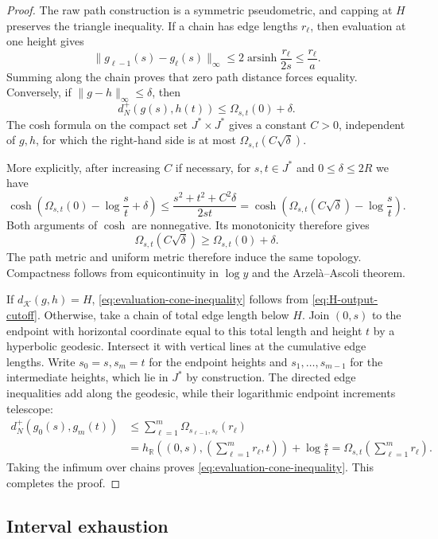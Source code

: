 \documentclass{amsart}
\numberwithin{equation}{section}
\theoremstyle{plain}
\theoremstyle{definition}
\theoremstyle{remark}
\newcommand{\R}{\mathbb R}
\DeclareMathOperator{\arsinh}{arsinh}
\begin{document}
\begin{proof}
The raw path construction is a symmetric pseudometric, and capping at $H$ preserves the triangle inequality.  If a chain has edge lengths $r_\ell$, then evaluation at one height gives
\[ \lVert g_{\ell-1}(s)-g_\ell(s)\rVert_\infty \le2\arsinh\frac{r_\ell}{2s} \le\frac{r_\ell}{a}. \]
Summing along the chain proves that zero path distance forces equality.  Conversely, if $\lVert g-h\rVert_\infty\le\delta$, then
\[ d_N^+(g(s),h(t))\le\Omega_{s,t}(0)+\delta. \]
The cosh formula on the compact set $J^*\times J^*$ gives a constant $C>0$, independent of $g,h$, for which the right-hand side is at most $\Omega_{s,t}(C\sqrt\delta)$.

More explicitly, after increasing $C$ if necessary, for $s,t\in J^*$ and $0\le\delta\le2R$ we have
\[ \cosh\left(\Omega_{s,t}(0)-\log\frac{s}{t}+\delta\right) \le\frac{s^2+t^2+C^2\delta}{2st} =\cosh\left(\Omega_{s,t}(C\sqrt\delta)-\log\frac{s}{t}\right). \]
Both arguments of $\cosh$ are nonnegative.  Its monotonicity therefore gives
\[ \Omega_{s,t}(C\sqrt\delta)\ge\Omega_{s,t}(0)+\delta. \]
The path metric and uniform metric therefore induce the same topology.  Compactness follows from equicontinuity in $\log y$ and the Arzel\`a--Ascoli theorem.

If $d_{\mathscr K}(g,h)=H$, \eqref{eq:evaluation-cone-inequality} follows from \eqref{eq:H-output-cutoff}.  Otherwise, take a chain of total edge length below $H$.  Join $(0,s)$ to the endpoint with horizontal coordinate equal to this total length and height $t$ by a hyperbolic geodesic.  Intersect it with vertical lines at the cumulative edge lengths.  Write $s_0=s,s_m=t$ for the endpoint heights and $s_1,\ldots,s_{m-1}$ for the intermediate heights, which lie in $J^*$ by construction.  The directed edge inequalities add along the geodesic, while their logarithmic endpoint increments telescope:
\[
 \begin{aligned}
d_N^+(g_0(s),g_m(t)) &\le\sum_{\ell=1}^m\Omega_{s_{\ell-1},s_\ell}(r_\ell)\\
 &=h_{\R}\left((0,s),\left(\sum_{\ell=1}^m r_\ell,t\right)\right)+\log\frac{s}{t}
 =\Omega_{s,t}\left(\sum_{\ell=1}^m r_\ell\right).
 \end{aligned}
\]
Taking the infimum over chains proves \eqref{eq:evaluation-cone-inequality}.  This completes the proof.
\end{proof}

\subsection{Interval exhaustion}
\end{document}
